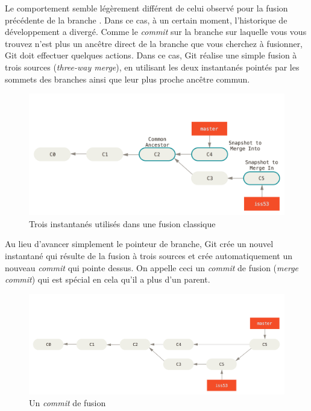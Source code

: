 Le comportement semble légèrement différent de celui observé pour la fusion précédente de la branche .
Dans ce cas, à un certain moment, l'historique de développement a divergé.
Comme le \emph{commit} sur la branche sur laquelle vous vous trouvez n'est plus un ancêtre direct de la branche que vous cherchez à fusionner, Git doit effectuer quelques actions.
Dans ce cas, Git réalise une simple fusion à trois sources (\emph{three-way merge}), en utilisant les deux instantanés pointés par les sommets des branches ainsi que leur plus proche ancêtre commun.

\begin{figure}[H]
  \centering
  \includegraphics{images/basic-merging-1}
  \caption{Trois instantanés utilisés dans une fusion classique}
  \label{fig:git:basic-merging-1}
\end{figure}

Au lieu d'avancer simplement le pointeur de branche, Git crée un nouvel instantané qui résulte de la fusion à trois sources et crée automatiquement un nouveau \emph{commit} qui pointe dessus.
On appelle ceci un \emph{commit} de fusion (\emph{merge commit}) qui est spécial en cela qu'il a plus d'un parent.

\begin{figure}[H]
  \centering
  \includegraphics{images/basic-merging-2}
  \caption{Un \emph{commit} de fusion}
  \label{fig:git:basic-merging-2}
\end{figure}

